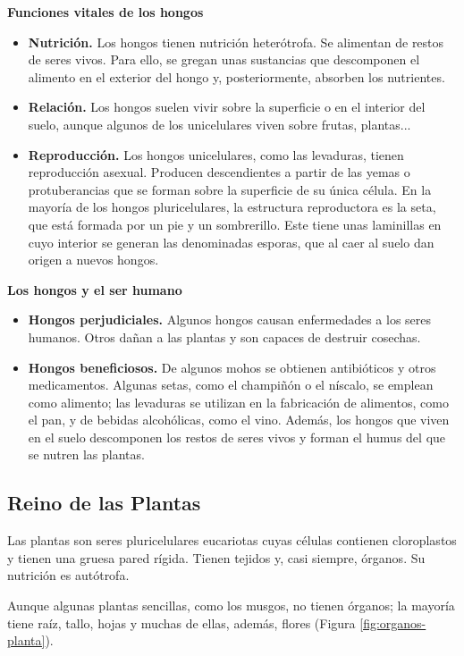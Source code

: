 \textbf{Funciones vitales de los hongos}
\begin{itemize}
    \item \textbf{Nutrición.} Los hongos tienen nutrición heterótrofa. Se alimentan de restos de seres vivos. Para ello, se gregan unas sustancias que descomponen el alimento en el exterior del hongo y, posteriormente, absorben los nutrientes.
    \item \textbf{Relación.} Los hongos suelen vivir sobre la superficie o en el interior del suelo, aunque algunos de los unicelulares viven sobre frutas, plantas...
    \item \textbf{Reproducción.} Los hongos unicelulares, como las levaduras, tienen reproducción asexual. Producen descendientes a partir de las yemas o protuberancias que se forman sobre la superficie de su única célula. En la mayoría de los hongos pluricelulares, la estructura reproductora es la seta, que está formada por un pie y un sombrerillo. Este tiene unas laminillas en cuyo interior se generan las denominadas esporas, que al caer al suelo dan origen a nuevos hongos.
\end{itemize}

\textbf{Los hongos y el ser humano}
\begin{itemize}
    \item \textbf{Hongos perjudiciales.} Algunos hongos causan enfermedades a los seres humanos. Otros dañan a las plantas y son capaces de destruir cosechas.
    \item \textbf{Hongos beneficiosos.} De algunos mohos se obtienen antibióticos y otros medicamentos. Algunas setas, como el champiñón o el níscalo, se emplean como alimento; las levaduras se utilizan en la fabricación de alimentos, como el pan, y de bebidas alcohólicas, como el vino. Además, los hongos que viven en el suelo descomponen los restos de seres vivos y forman el humus del que se nutren las plantas.
\end{itemize}

\subsection{Reino de las Plantas}

Las plantas son seres pluricelulares eucariotas cuyas células contienen cloroplastos y tienen una gruesa pared rígida. Tienen tejidos y, casi siempre, órganos. Su nutrición es autótrofa.

\vspace{3mm}
Aunque algunas plantas sencillas, como los musgos, no tienen órganos; la mayoría tiene raíz, tallo, hojas y muchas de ellas, además, flores (Figura \ref{fig:organos-planta}).


